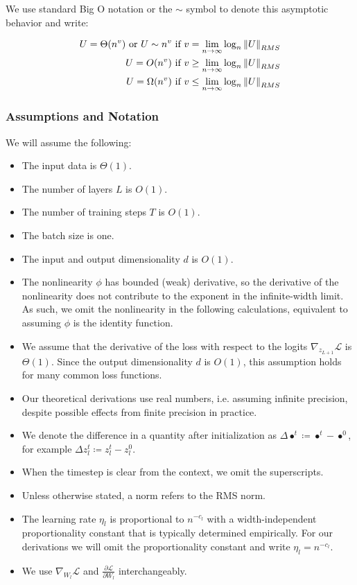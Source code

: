 \documentclass{article}
\theoremstyle{plain}
\theoremstyle{definition}
\theoremstyle{remark}
\newcommand{\loss}{\mathcal{L}}
\newcommand{\partialloss}[1]{\frac{\partial \mathcal{L}}{\partial #1}}
\begin{document}
We use standard Big O notation or the $\sim$ symbol to denote this asymptotic behavior and write:

\begin{align*}
U = \Theta(n^v) \textrm{ or } U \sim n^v \textrm{ if } v =  \lim_{n \rightarrow \infty} \log_n \norm{U}_{RMS}\\
U = O(n^v) \textrm{ if } v \geq  \lim_{n \rightarrow \infty} \log_n \norm{U}_{RMS}\\
U = \Omega(n^v) \textrm{ if } v \leq  \lim_{n \rightarrow \infty} \log_n \norm{U}_{RMS}
\end{align*}

\subsubsection{Assumptions and Notation}
\label{app:theory_assumptions}
We will assume the following:
\begin{itemize}
    \setlength\itemsep{-0.2em}
    \item The input data is $\Theta(1)$.
    \item The number of layers $L$ is $O(1)$.
    \item The number of training steps $T$ is $O(1)$.
    \item The batch size is one.
    \item The input and output dimensionality $d$ is $O(1)$.
    \item The nonlinearity $\phi$ has bounded (weak) derivative, so the derivative of the nonlinearity does not contribute to the exponent in the infinite-width limit. As such, we omit the nonlinearity in the following calculations, equivalent to assuming $\phi$ is the identity function.
    \item We assume that the derivative of the loss with respect to the logits $\nabla_{z_{L+1}} \loss$ is $\Theta(1)$. Since the output dimensionality $d$ is $O(1)$, this assumption holds for many common loss functions.
    \item Our theoretical derivations use real numbers, i.e. assuming infinite precision, despite possible effects from finite precision in practice.
    \item We denote the difference in a quantity after initialization as $\Delta \bullet^t \coloneqq \bullet ^t - \bullet ^0$, for example $\Delta z_l^t \coloneqq z_l ^t - z_l ^0$.
    \item When the timestep is clear from the context, we omit the superscripts.
    \item Unless otherwise stated, a norm refers to the RMS norm.
    \item The learning rate $\eta_l$ is proportional to $n^{-c_l}$ with a width-independent proportionality constant that is typically determined empirically. For our derivations we will omit the proportionality constant and write $\eta_l = n^{-c_l}$.
    \item We use $\nabla_{W_l} \loss$ and $\partialloss{W_l}$ interchangeably.
\end{itemize}
\end{document}
